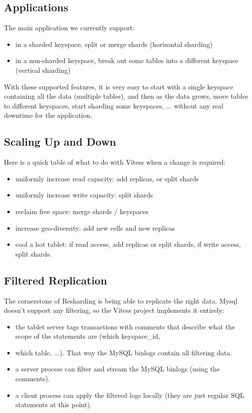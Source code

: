 \subsection{Applications}\hypertarget{applications}{}\label{applications}

The main application we currently support:


\begin{itemize}
\item in a sharded keyspace, split or merge shards (horizontal sharding)
\item in a non-sharded keyspace, break out some tables into a different keyspace (vertical sharding)
\end{itemize}

With these supported features, it is very easy to start with a single keyspace containing all the data (multiple tables),
and then as the data grows, move tables to different keyspaces, start sharding some keyspaces, ... without any real
downtime for the application.

\subsection{Scaling Up and Down}\hypertarget{scaling-up-and-down}{}\label{scaling-up-and-down}

Here is a quick table of what to do with Vitess when a change is required:

\begin{itemize}
\item uniformly increase read capacity: add replicas, or split shards
\item uniformly increase write capacity: split shards
\item reclaim free space: merge shards / keyspaces
\item increase geo-diversity: add new cells and new replicas
\item cool a hot tablet: if read access, add replicas or split shards, if write access, split shards.
\end{itemize}

\subsection{Filtered Replication}\hypertarget{filtered-replication}{}\label{filtered-replication}

The cornerstone of Resharding is being able to replicate the right data. Mysql doesn't support any filtering, so the
Vitess project implements it entirely:
\begin{itemize}
\item the tablet server tags transactions with comments that describe what the scope of the statements are (which keyspace\_id,
\item which table, ...). That way the MySQL binlogs contain all filtering data.
\item a server process can filter and stream the MySQL binlogs (using the comments).
\item a client process can apply the filtered logs locally (they are just regular SQL statements at this point).
\end{itemize}
